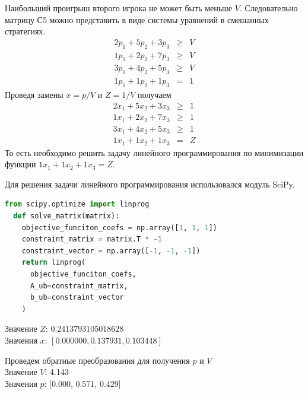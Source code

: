 \documentclass[12pt,a4paper]{article}%
\begin{document}
Наибольший проигрыш второго игрока не может быть меньше $V$.
Следовательно матрицу С5 можно представить в виде системы
уравнений в смешанных стратегиях.
$$
\begin{aligned}
  2p_1+5p_2+3p_3 &\geq& V \\
  1p_1+2p_2+7p_3 &\geq& V \\
  3p_1+4p_2+5p_3 &\geq& V \\
  1p_1+1p_2+1p_3 &=& 1  
\end{aligned}
$$
Проведя замены $x = p / V$ и $Z = 1 / V$ получаем
$$
\begin{aligned}
  2x_1+5x_2+3x_3 &\geq& 1 \\
  1x_1+2x_2+7x_3 &\geq& 1 \\
  3x_1+4x_2+5x_3 &\geq& 1 \\
  1x_1+1x_2+1x_3 &=& Z
\end{aligned}
$$
То есть необходимо решить задачу линейного программирования
по минимизации функции $1x_1+1x_2+1x_3 = Z$.

\pagebreak
Для решения задачи линейного программирования использовался модуль SciPy.
\begin{lstlisting}[language=Python]
  from scipy.optimize import linprog
  def solve_matrix(matrix):
    objective_funciton_coefs = np.array([1, 1, 1])
    constraint_matrix = matrix.T * -1
    constraint_vector = np.array([-1, -1, -1])
    return linprog(
      objective_funciton_coefs,
      A_ub=constraint_matrix,
      b_ub=constraint_vector
    )
\end{lstlisting}
Значение $Z$: $0.2413793105018628$\\
Значения $x$: $[0.000000, 0.137931, 0.103448]$

\vspace{\baselineskip}
Проведем обратные преобразования для получения $p$ и $V$\\
Значение $V$: 4.143\\
Значения $p$: [0.000, 0.571, 0.429]
\end{document}
